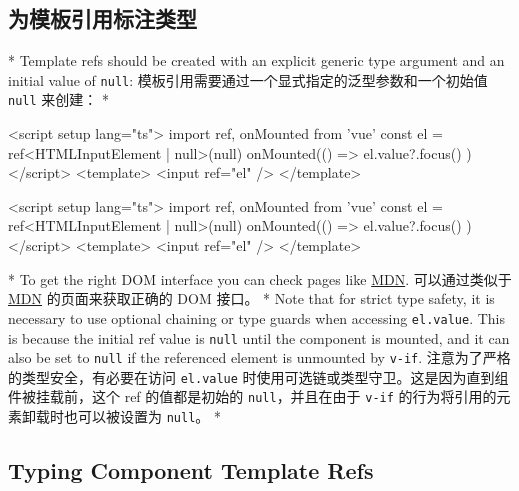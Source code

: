 \begin{paracol}{2}
\subsection{为模板引用标注类型}
\switchcolumn[0]*%
Template refs should be created with an explicit generic type argument
and an initial value of \texttt{null}:
\switchcolumn
模板引用需要通过一个显式指定的泛型参数和一个初始值 \texttt{null}
来创建：
\switchcolumn[0]*%
\begin{codeHtml}
<script setup lang="ts">
import { ref, onMounted } from 'vue'
const el = ref<HTMLInputElement | null>(null)
onMounted(() => {
  el.value?.focus()
})
</script>
<template>
  <input ref="el" />
</template>
\end{codeHtml}
\switchcolumn
\begin{codeHtml}
<script setup lang="ts">
import { ref, onMounted } from 'vue'
const el = ref<HTMLInputElement | null>(null)
onMounted(() => {
  el.value?.focus()
})
</script>
<template>
  <input ref="el" />
</template>
\end{codeHtml}
\switchcolumn[0]*%
To get the right DOM interface you can check pages like
\href{https://developer.mozilla.org/en-US/docs/Web/HTML/Element/input\#technical_summary}{MDN}.
\switchcolumn
可以通过类似于
\href{https://developer.mozilla.org/zh-CN/docs/Web/HTML/Element/input\#technical_summary}{MDN}
的页面来获取正确的 DOM 接口。
\switchcolumn[0]*%
Note that for strict type safety, it is necessary to use optional
chaining or type guards when accessing \texttt{el.value}. This is
because the initial ref value is \texttt{null} until the component is
mounted, and it can also be set to \texttt{null} if the referenced
element is unmounted by \texttt{v-if}.
\switchcolumn
注意为了严格的类型安全，有必要在访问 \texttt{el.value}
时使用可选链或类型守卫。这是因为直到组件被挂载前，这个 ref
的值都是初始的 \texttt{null}，并且在由于 \texttt{v-if}
的行为将引用的元素卸载时也可以被设置为 \texttt{null}。
\switchcolumn[0]*%
\subsection{Typing Component Template Refs}
\switchcolumn

\end{paracol}
